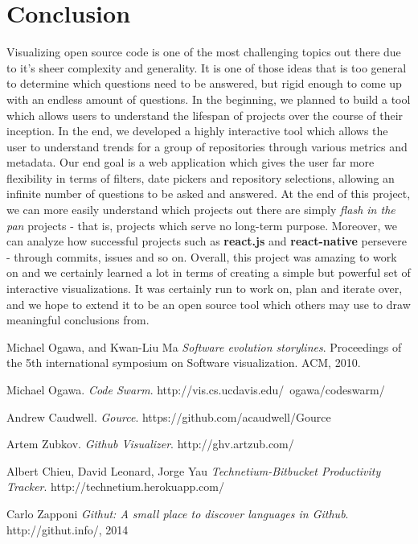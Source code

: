 \documentclass{article}
\begin{document}
\section {Conclusion}

Visualizing open source code is one of the most challenging topics out there due to it's sheer complexity and generality. It is one of those ideas that is too general to determine which questions need to be answered, but rigid enough to come up with an endless amount of questions. In the beginning, we planned to build a tool which allows users to understand the lifespan of projects over the course of their inception. In the end, we developed a highly interactive tool which allows the user to understand trends for a group of repositories through various metrics and metadata. Our end goal is a web application which gives the user far more flexibility in terms of filters, date pickers and repository selections, allowing an infinite number of questions to be asked and answered. At the end of this project, we can more easily understand which projects out there are simply \emph{flash in the pan} projects - that is, projects which serve no long-term purpose. Moreover, we can analyze how successful projects such as \textbf{react.js} and \textbf{react-native} persevere - through commits, issues and so on. Overall, this project was amazing to work on and we certainly learned a lot in terms of creating a simple but powerful set of interactive visualizations. It was certainly run to work on, plan and iterate over, and we hope to extend it to be an open source tool which others may use to draw meaningful conclusions from.

\newpage

\begin{thebibliography}{9}
 
Michael Ogawa, and Kwan-Liu Ma
\textit{Software evolution storylines}.
Proceedings of the 5th international symposium on Software visualization. ACM, 2010.

Michael Ogawa.
\textit{Code Swarm}.
http://vis.cs.ucdavis.edu/~ogawa/codeswarm/

Andrew Caudwell.
\textit{Gource}.
https://github.com/acaudwell/Gource

Artem  Zubkov.
\textit{Github Visualizer}.
http://ghv.artzub.com/

Albert Chieu, David Leonard, Jorge Yau
\textit{Technetium-Bitbucket Productivity Tracker}.
http://technetium.herokuapp.com/

Carlo Zapponi
\textit{Githut: A small place to discover languages in Github}.
http://githut.info/, 2014

\end{thebibliography}
\end{document}
